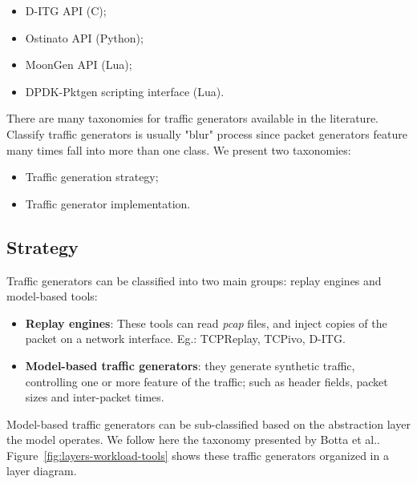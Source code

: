 \begin{itemize}
\item D-ITG API (C)\cite{web-ditg};
\item Ostinato API (Python)\cite{web-ostinato};
\item MoonGen API (Lua)\cite{web-moongen};
\item DPDK-Pktgen scripting interface (Lua)\cite{web-dpdk-pktgen}.
\end{itemize}

There are many taxonomies for traffic generators available in the literature. Classify traffic generators is usually "blur" process since packet generators feature many times fall into more than one class. We present two taxonomies:

\begin{itemize}
\item Traffic generation strategy;
\item Traffic generator implementation.
\end{itemize}

\subsection{Strategy}


Traffic generators can be classified into two main groups: replay engines\cite{sourcesonoff-paper} and model-based tools:

\begin{itemize}
\item \textbf{Replay engines}: These tools can read \textit{pcap} files, and inject copies of the packet on a network interface. Eg.: TCPReplay\cite{web-tcpreplay}, TCPivo\cite{tcpivo-paper}, D-ITG\cite{ditg-paper}.
\item \textbf{Model-based traffic generators}: they generate synthetic traffic, controlling one or more feature of the traffic; such as header fields, packet sizes and inter-packet times.  
\end{itemize}

Model-based traffic generators can be sub-classified based on the abstraction layer the model operates. We follow here the taxonomy presented by Botta et al.\cite{do-you-trust}. Figure~\ref{fig:layers-workload-tools} shows these traffic generators organized in a layer diagram.

